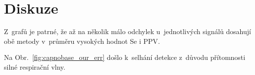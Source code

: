 \chapter{Diskuze} %
\label{ch:diskuze}

Z~grafů je patrné, že až na několik málo odchylek u~jednotlivých signálů dosahují obě metody v~průměru vysokých hodnot \acs{Se} i \acs{PPV}.

Na Obr.~\ref{fig:capnobase_our_err} došlo k~selhání detekce z~důvodu přítomnosti silné respirační vlny.



